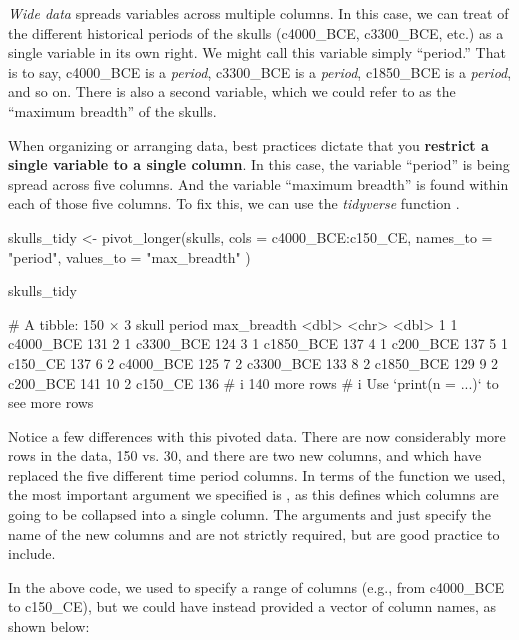 \textit{Wide data} spreads variables across multiple columns. In this case, we can treat of the different historical periods of the skulls (c4000\_BCE, c3300\_BCE, etc.) as a single variable in its own right. We might call this variable simply ``period.'' That is to say, c4000\_BCE is a \textit{period}, c3300\_BCE is a \textit{period}, c1850\_BCE is a \textit{period}, and so on. There is also a second variable, which we could refer to as the ``maximum breadth'' of the skulls.

When organizing or arranging data, best practices dictate that you \textbf{restrict a single variable to a single column}. In this case, the variable ``period'' is being spread across five columns. And the variable ``maximum breadth'' is found within each of those five columns. To fix this, we can use the \textit{tidyverse} function .

\begin{inR}
skulls_tidy <- pivot_longer(skulls,
  cols = c4000_BCE:c150_CE,
  names_to = "period",
  values_to = "max_breadth"
)

skulls_tidy
\end{inR}
\begin{outR}
# A tibble: 150 × 3
   skull period    max_breadth
   <dbl> <chr>           <dbl>
 1     1 c4000_BCE         131
 2     1 c3300_BCE         124
 3     1 c1850_BCE         137
 4     1 c200_BCE          137
 5     1 c150_CE           137
 6     2 c4000_BCE         125
 7     2 c3300_BCE         133
 8     2 c1850_BCE         129
 9     2 c200_BCE          141
10     2 c150_CE           136
# i 140 more rows
# i Use `print(n = ...)` to see more rows
\end{outR}

Notice a few differences with this pivoted data. There are now considerably more rows in the data, 150 vs. 30, and there are two new columns,  and  which have replaced the five different time period columns. In terms of the  function we used, the most important argument we specified is , as this defines which columns are going to be collapsed into a single column. The arguments  and  just specify the name of the new columns and are not strictly required, but are good practice to include.

In the above code, we used \R{:} to specify a range of columns (e.g., from c4000\_BCE to c150\_CE), but we could have instead provided a vector of column names, as shown below:

